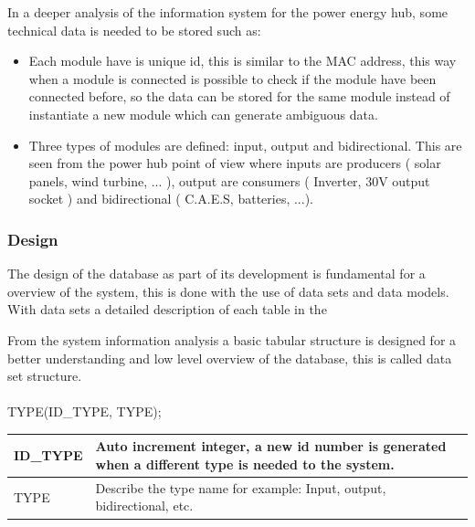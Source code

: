 In a deeper analysis of the information system for the power energy hub, some technical data is needed to be stored such as:
	\begin{itemize}
		\item Each module have is unique id, this is similar to the MAC address, this way when a module is connected is possible to check if the module have been connected before, so the data can be stored for the same module instead of instantiate a new module which can generate ambiguous data.
		\item Three types of modules are defined: input, output and bidirectional. This are seen from the power hub point of view where inputs are producers ( solar panels, wind turbine, ... ), output are consumers ( Inverter, 30V output socket ) and bidirectional ( C.A.E.S, batteries, ...).
	\end{itemize}

%	
%	
\subsubsection{Design}
The design of the database as part of its development is fundamental for a overview of the system, this is done with the use of data sets and data models. With data sets a detailed description of each table in the 

From the system information analysis a basic tabular structure is designed for a better understanding and low level overview of the database, this is called data set structure.
\\\\
TYPE(ID\_TYPE, TYPE);

\begin{table}[H]
\centering
	\begin{tabular}{| p{2cm} | p{10cm} |}
		\hline
		ID\_TYPE & Auto increment integer, a new id number is generated when a different type is needed to the system. \\\hline
		TYPE & Describe the type name for example: Input, output, bidirectional, etc.\\\hline
	\end{tabular}
\end{table}

